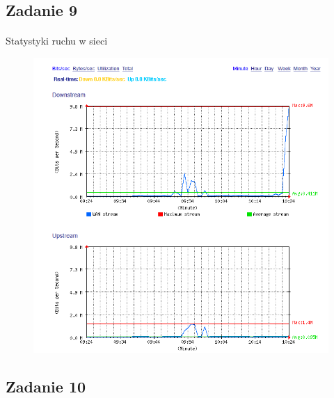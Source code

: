\documentclass[wide,a4paper,titlepage,12pt] {article}
\begin{document}
  \subsection{Zadanie 9}
  \paragraph{}
  Statystyki ruchu w sieci
  \begin{figure}[h!]
    \begin{center}
      \includegraphics[width=\textwidth]{9.PNG}
    \end{center}
  \end{figure}


  \subsection{Zadanie 10}
\end{document}
